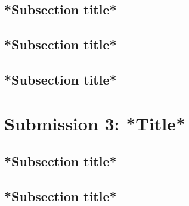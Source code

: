 \documentclass[a4paper, 11pt]{article}
\begin{document}
\vspace{0.5cm}
\subsection{*Subsection title*}




\vspace{0.5cm}
\subsection{*Subsection title*}




\vspace{0.5cm}
\subsection{*Subsection title*}








\newpage
\section{Submission 3: *Title* }


\vspace{0.5cm}
\subsection{*Subsection title*}




\vspace{0.5cm}
\subsection{*Subsection title*}
\end{document}

